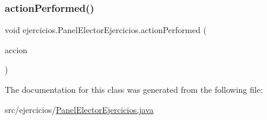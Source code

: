 \subsubsection{\texorpdfstring{action\+Performed()}{actionPerformed()}}
{\footnotesize\ttfamily void ejercicios.\+Panel\+Elector\+Ejercicios.\+action\+Performed (\begin{DoxyParamCaption}\item[{Action\+Event}]{accion }\end{DoxyParamCaption})}



The documentation for this class was generated from the following file\+:\begin{DoxyCompactItemize}
\item 
src/ejercicios/\mbox{\hyperlink{_panel_elector_ejercicios_8java}{Panel\+Elector\+Ejercicios.\+java}}\end{DoxyCompactItemize}
